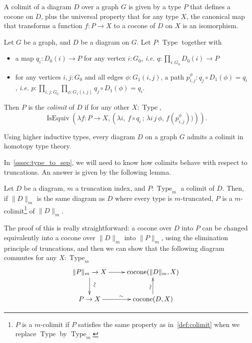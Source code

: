 \documentclass[notfinal]{jfrarticle}
\DeclareMathOperator{\Type}{Type}
\DeclareMathOperator{\IsEquiv}{IsEquiv}
\newcommand{\ie}{\emph{i.e.}}
\begin{document}
A colimit of a diagram $D$ over a graph $G$ is given by a type $P$
that defines a cocone on $D$, plus the universal property that for any
type $X$, the canonical map that transforms a function $f : P
\rightarrow X$ to a cocone of $D$ on $X$ is an isomorphism.
% 
\begin{defi}\label{def:colimit}
Let $G$ be a graph, and $D$ be a diagram on $G$. 
Let $P:\Type$ together with
\begin{itemize}
\item a map $q_i : D_0(i) \to P$ for any
vertex $i:G_0$, \ie{} $q : \prod_{i:G_0} D_0(i) \to P$
\item for any vertices $i,j:G_0$ and all edges $\phi:G_1(i,j)$, a path
  $p_{i,j}^\phi : q_j \circ D_1(\phi) = q_i$, \ie{}
  $p : \prod_{i,j:G_0} \prod_{\phi:G_1(i,j)} q_j \circ D_1(\phi) = q_i.$
\end{itemize}

Then $P$ is the {\em colimit} of $D$ if for any other $X:\Type$, 
\[
\IsEquiv\left(\lambda f:P \to X, \left( \lambda i,~f \circ q_i\, ;\, \lambda i\, j\,
  \phi,\, f (p_{i, j}^\phi)) \right)\right).
\]
\end{defi}
Using higher inductive types, every diagram $D$ on a graph $G$ admits a
colimit in homotopy type theory. 

In~\ref{sssec:type_to_sep}, we will need to know how colimits
behave with respect to truncations. An answer is given by the
following lemma. 

\begin{lem}
  Let $D$ be a diagram, $m$ a truncation index, and
  $P:\Type_{m}$ a colimit of $D$. 
  Then, if $\|D\|_m$ is the same diagram as $D$ where every type
  is $m$-truncated, $P$ is a $m$-colimit\footnote{$P$ is a $m$-colimit
    if $P$ satisfies the same property as in~\ref{def:colimit} when
    we replace $\Type$ by $\Type_m$} of $\|D\|_m$.
\end{lem}
The proof of this is really straightforward: a cocone over $D$ into
$P$ can be changed equivalently into a cocone over $\|D\|_m$ into $\|P\|_m$, using the
elimination principle of truncations, and then
we can show that the following diagram commutes for any $X:\Type_m$
\[
  \xymatrix{
    \|P\|_m \to X \ar[r] \ar[d]^*[@]{\hbox to 0pt{\hss$\sim$\hss}} & \mathrm{cocone}(\|D\|_m,X) \\
    P \to X \ar[r]^\sim& \mathrm{cocone}(D,X) \ar[u]^*[@]{\hbox to 0pt{\hss$\sim$\hss}}
  }
\]

\end{document}
